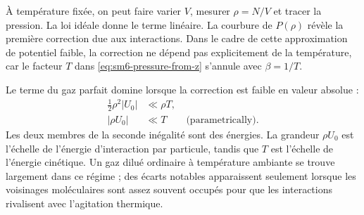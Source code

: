 \begin{classroomqa}
\end{classroomqa}

À température fixée, on peut faire varier \(V\), mesurer \(\rho=N/V\) et tracer la pression. La loi idéale donne le terme linéaire. La courbure de \(P(\rho)\) révèle la première correction due aux interactions. Dans le cadre de cette approximation de potentiel faible, la correction ne dépend pas explicitement de la température, car le facteur \(T\) dans \eqref{eq:sm6-pressure-from-z} s’annule avec \(\beta=1/T\).

\begin{classroomqa}
\end{classroomqa}

Le terme du gaz parfait domine lorsque la correction est faible en valeur absolue :
\begin{equation}
 \begin{aligned}
 \frac{1}{2}\rho^2|U_0|&\ll \rho T,\\
 |\rho U_0|&\ll T
 \qquad\text{(parametrically)}.
 \end{aligned}
 \label{eq:sm6-ideal-validity}
\end{equation}
Les deux membres de la seconde inégalité sont des énergies. La grandeur \(\rho U_0\) est l’échelle de l’énergie d’interaction par particule, tandis que \(T\) est l’échelle de l’énergie cinétique. Un gaz dilué ordinaire à température ambiante se trouve largement dans ce régime ; des écarts notables apparaissent seulement lorsque les voisinages moléculaires sont assez souvent occupés pour que les interactions rivalisent avec l’agitation thermique.

